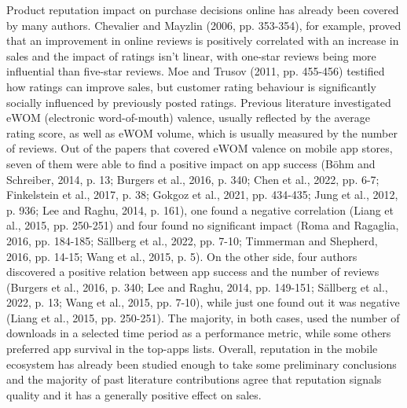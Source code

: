 Product reputation impact on purchase decisions online has already been covered by many authors. Chevalier and Mayzlin (2006, pp. 353-354), for example, proved that an improvement in online reviews is positively correlated with an increase in sales and the impact of ratings isn't linear, with one-star reviews being more influential than five-star reviews. Moe and Trusov (2011, pp. 455-456) testified how ratings can improve sales, but customer rating behaviour is significantly socially influenced by previously posted ratings. Previous literature investigated eWOM (electronic word-of-mouth) valence, usually reflected by the average rating score, as well as eWOM volume, which is usually measured by the number of reviews. Out of the papers that covered eWOM valence on mobile app stores, seven of them were able to find a positive impact on app success (Böhm and Schreiber, 2014, p. 13; Burgers et al., 2016, p. 340; Chen et al., 2022, pp. 6-7; Finkelstein et al., 2017, p. 38; Gokgoz et al., 2021, pp. 434-435; Jung et al., 2012, p. 936; Lee and Raghu, 2014, p. 161), one found a negative correlation (Liang et al., 2015, pp. 250-251) and four found no significant impact (Roma and Ragaglia, 2016, pp. 184-185; Sällberg et al., 2022, pp. 7-10; Timmerman and Shepherd, 2016, pp. 14-15; Wang et al., 2015, p. 5). On the other side, four authors discovered a positive relation between app success and the number of reviews (Burgers et al., 2016, p. 340; Lee and Raghu, 2014, pp. 149-151; Sällberg et al., 2022, p. 13; Wang et al., 2015, pp. 7-10), while just one found out it was negative (Liang et al., 2015, pp. 250-251). The majority, in both cases, used the number of downloads in a selected time period as a performance metric, while some others preferred app survival in the top-apps lists. Overall, reputation in the mobile ecosystem has already been studied enough to take some preliminary conclusions and the majority of past literature contributions agree that reputation signals quality and it has a generally positive effect on sales.

